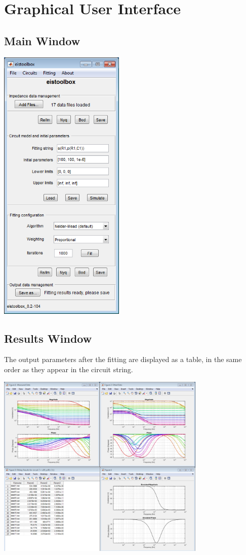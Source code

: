 \documentclass[9pt,a4paper,oneside]{book}
\begin{document}
\section{Graphical User Interface}

\subsection{Main Window}

\includegraphics[width=6cm]{main_screenshot.png}

\subsection{Results Window}

The output parameters after the fitting are displayed as a table, in the same order as they appear in the circuit string.

\includegraphics[width=10cm]{scr_results.png}
\end{document}
